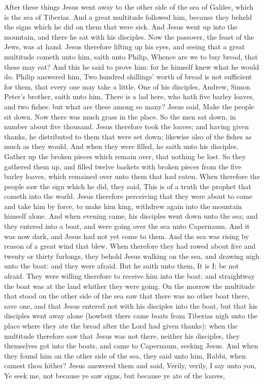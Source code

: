 After these things Jesus went away to the other side of the sea of Galilee, which is the sea of Tiberias. And a great multitude followed him, because they beheld the signs which he did on them that were sick. And Jesus went up into the mountain, and there he sat with his disciples. Now the passover, the feast of the Jews, was at hand. Jesus therefore lifting up his eyes, and seeing that a great multitude cometh unto him, saith unto Philip, Whence are we to buy bread, that these may eat? And this he said to prove him: for he himself knew what he would do. Philip answered him, Two hundred shillings’ worth of bread is not sufficient for them, that every one may take a little. One of his disciples, Andrew, Simon Peter’s brother, saith unto him, There is a lad here, who hath five barley loaves, and two fishes: but what are these among so many? Jesus said, Make the people sit down. Now there was much grass in the place. So the men sat down, in number about five thousand. Jesus therefore took the loaves; and having given thanks, he distributed to them that were set down; likewise also of the fishes as much as they would. And when they were filled, he saith unto his disciples, Gather up the broken pieces which remain over, that nothing be lost. So they gathered them up, and filled twelve baskets with broken pieces from the five barley loaves, which remained over unto them that had eaten. When therefore the people saw the sign which he did, they said, This is of a truth the prophet that cometh into the world.  Jesus therefore perceiving that they were about to come and take him by force, to make him king, withdrew again into the mountain himself alone.  And when evening came, his disciples went down unto the sea; and they entered into a boat, and were going over the sea unto Capernaum. And it was now dark, and Jesus had not yet come to them. And the sea was rising by reason of a great wind that blew. When therefore they had rowed about five and twenty or thirty furlongs, they behold Jesus walking on the sea, and drawing nigh unto the boat: and they were afraid. But he saith unto them, It is I; be not afraid. They were willing therefore to receive him into the boat: and straightway the boat was at the land whither they were going.  On the morrow the multitude that stood on the other side of the sea saw that there was no other boat there, save one, and that Jesus entered not with his disciples into the boat, but that his disciples went away alone (howbeit there came boats from Tiberias nigh unto the place where they ate the bread after the Lord had given thanks): when the multitude therefore saw that Jesus was not there, neither his disciples, they themselves got into the boats, and came to Capernaum, seeking Jesus. And when they found him on the other side of the sea, they said unto him, Rabbi, when camest thou hither? Jesus answered them and said, Verily, verily, I say unto you, Ye seek me, not because ye saw signs, but because ye ate of the loaves, 
